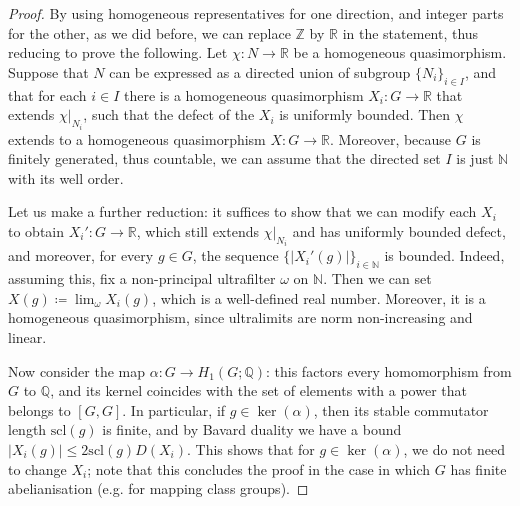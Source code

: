 \documentclass[svgnames]{amsart}
\theoremstyle{plain}
\theoremstyle{definition}
\newcommand{\Z}{\mathbb{Z}}
\newcommand{\R}{\mathbb{R}}
\begin{document}
\begin{proof}
    By using homogeneous representatives for one direction, and integer parts for the other, as we did before, we can replace $\Z$ by $\R$ in the statement, thus reducing to prove the following. Let $\chi \colon N \to \mathbb{R}$ be a homogeneous quasimorphism. Suppose that $N$ can be expressed as a directed union of subgroup $\{N_i\}_{i \in I}$, and that for each $i \in I$ there is a homogeneous quasimorphism $X_i \colon G \to \mathbb{R}$ that extends $\chi|_{N_i}$, such that the defect of the $X_i$ is uniformly bounded. Then $\chi$ extends to a homogeneous quasimorphism $X \colon G \to \mathbb{R}$. Moreover, because $G$ is finitely generated, thus countable, we can assume that the directed set $I$ is just $\mathbb{N}$ with its well order.

    Let us make a further reduction: it suffices to show that we can modify each $X_i$ to obtain $X_i' \colon G \to \mathbb{R}$, which still extends $\chi|_{N_i}$ and has uniformly bounded defect, and moreover, for every $g\in G$, the sequence $\{|X_i'(g)|\}_{i\in \mathbb{N}}$ is bounded. Indeed, assuming this, fix a non-principal ultrafilter $\omega$ on $\mathbb{N}$. Then we can set $X(g) \coloneqq \lim_\omega X_i(g)$, which is a well-defined real number. Moreover, it is a homogeneous quasimorphism, since ultralimits are norm non-increasing and linear.

    Now consider the map $\alpha \colon G \to H_1(G; \mathbb{Q})$: this factors every homomorphism from $G$ to $\mathbb{Q}$, and its kernel coincides with the set of elements with a power that belongs to $[G, G]$. In particular, if $g \in \ker(\alpha)$, then its stable commutator length $\mathrm{scl}(g)$ is finite, and by Bavard duality \cite{bavard} we have a bound $|X_i(g)| \leq 2 \mathrm{scl}(g) D(X_i)$. This shows that for $g \in \ker(\alpha)$, we do not need to change $X_i$; note that this concludes the proof in the case in which $G$ has finite abelianisation (e.g. for mapping class groups).


\end{proof}
\end{document}
